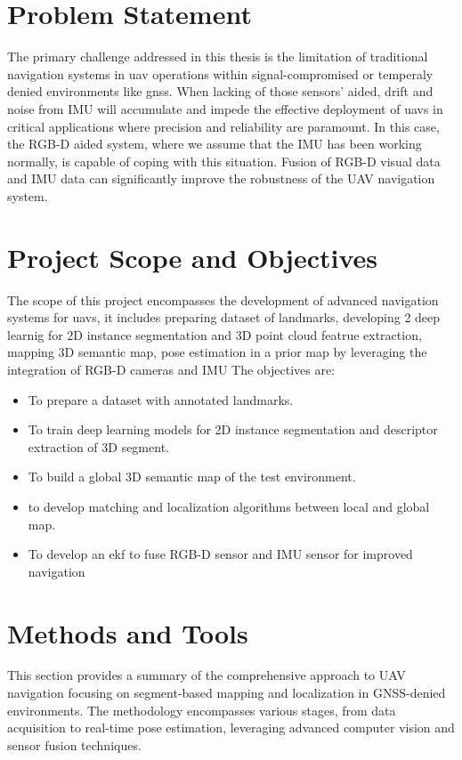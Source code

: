 \section{Problem Statement}

The primary challenge addressed in this thesis is the limitation of traditional navigation systems in \acrshort{uav} operations within signal-compromised or temperaly denied environments like gnss. When lacking of those sensors' aided, drift and noise from IMU will accumulate and impede the effective deployment of \acrshort{uavs} in critical applications where precision and reliability are paramount. In this case, the RGB-D aided system, where we assume that the IMU has been working normally, is capable of coping with this situation. Fusion of RGB-D visual data and IMU data can significantly improve the robustness of the UAV navigation system.

\section{Project Scope and Objectives}
The scope of this project encompasses the development of advanced navigation systems for \acrshort{uavs}, it includes preparing dataset of landmarks, developing 2 deep learnig for 2D instance segmentation and 3D point cloud featrue extraction, mapping 3D semantic map, pose estimation in a prior map by leveraging the integration of RGB-D cameras and IMU
The objectives are:
\begin{itemize}
\item To prepare a dataset with annotated landmarks.
\item To train deep learning models for 2D instance segmentation and descriptor extraction of 3D segment.
\item To build a global 3D semantic map of the test environment.
\item to develop matching and localization algorithms between local and global map.
\item To develop an \acrfull{ekf} to fuse RGB-D sensor and IMU sensor for improved navigation
\end{itemize}

\section{Methods and Tools}

This section provides a summary of the comprehensive approach to UAV navigation focusing on segment-based mapping and localization in GNSS-denied environments. The methodology encompasses various stages, from data acquisition to real-time pose estimation, leveraging advanced computer vision and sensor fusion techniques.

